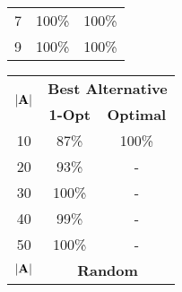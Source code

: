 \documentclass[twoside,11pt]{article}
\begin{document}
\begin{table}[t]
\begin{minipage}{0.30\textwidth}
\begin{tabular}{|c|cc|}
7                                  & \multicolumn{1}{c|}{100\%}      & 100\%        \\
9                                  & \multicolumn{1}{c|}{100\%}      & 100\%        \\ \hline
\end{tabular}
\end{minipage}%
\hspace{1em} %
\begin{minipage}{0.30\textwidth} %
\centering
\begin{tabular}{|c|cc|}
\hline
\multirow{2}{*}{$|{\bf{A}}|$} & \multicolumn{2}{c|}{\textbf{Best Alternative}}            \\ 
                              & \multicolumn{1}{c|}{\textbf{1-Opt}}   & \textbf{Optimal}   \\ \hline
10                            & \multicolumn{1}{c|}{87\%}      & 100\%        \\
20                            & \multicolumn{1}{c|}{93\%}      & -          \\
30                            & \multicolumn{1}{c|}{100\%}      & -          \\
40                            & \multicolumn{1}{c|}{99\%}      & -          \\
50                            & \multicolumn{1}{c|}{100\%}      & -          \\ \hline \hline
\multirow{2}{*}{$|{\bf{A}}|$} & \multicolumn{2}{c|}{\textbf{Random}}               \\ 

\end{tabular}
\end{minipage}
\end{table}
\end{document}
